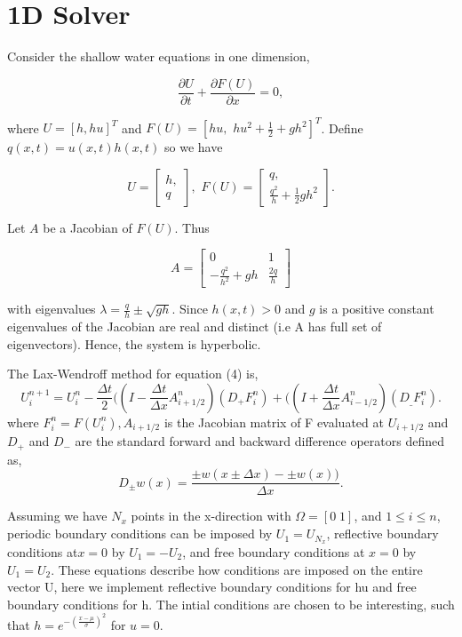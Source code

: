 \section{1D Solver}
\par Consider the shallow water equations in one dimension,

\begin{equation}
\frac{\partial U}{\partial t} + \frac{\partial F(U)}{\partial x} = 0,
\end{equation}

where $U = [h, hu]^T$ and $F(U) = [hu,\,\, hu^2 + \frac{1}{2} + gh^2]^T$. Define $q(x,t) = u(x,t) h(x,t)$ so we have

\[U = \begin{bmatrix} h, \\ q\end{bmatrix},\,\, F(U) = \begin{bmatrix} q,\\ \frac{q^2}{h} + \frac{1}{2} gh^2 \end{bmatrix}.\]

Let $A$ be a Jacobian of $F(U)$. Thus

\begin{equation}
A = \begin{bmatrix} 0 & 1 \\ -\frac{q^2}{h^2} + gh & \frac{2q}{h}\end{bmatrix}
\end{equation}

with eigenvalues $\lambda = \frac{q}{h} \pm \sqrt{gh}.$ Since $h(x,t) > 0$ and $g$ is a positive constant eigenvalues of the Jacobian are
real and distinct (i.e A has full set of eigenvectors). Hence, the system is hyperbolic. \newline

The Lax-Wendroff method for equation (4) is,
\begin{equation}\label{eqn:4}
U_i^{n+1}=U_i^n-\frac{{\Delta t}}{2}((I-\frac{{\Delta t}}{{\Delta x}}A_{i+1/2}^n)(D_+F_i^n)+((I+\frac{{\Delta
t}}{{\Delta x}}A_{i-1/2}^n)(D_{\_}F_i^n).
\end{equation}
where \(F_i^n=F(U_i^n), A_{i+1/2}\) is the Jacobian matrix of F evaluated at \(U_{i+1/2}\) and \(D_+\) and \(D_-\) are the standard forward
and backward difference operators defined as,
\begin{equation}\label{eqn:5}
D_{\pm }w(x)=\frac{\pm w(x\pm {\Delta x})-\pm w(x))}{{\Delta x}}. 
\end{equation}

Assuming we have \(N_x\) points in the x-direction with \(\Omega =[0\;1]\), and \(1\leq i\leq n\), periodic boundary
conditions can be imposed by \(U_1=U_{N_x}\), reflective boundary conditions at\(x=0\) by \(U_1=-U_2\), and free boundary conditions at \(x=0\) by
\(U_1=U_2\). These equations describe how conditions are imposed on the entire vector U, here we implement reflective boundary
conditions for hu and free boundary conditions for h. The intial conditions are chosen to be interesting, such that
 $h=e^{-(\frac{x-\mu }{\sigma })^2}$ for $u=0$. \newline


